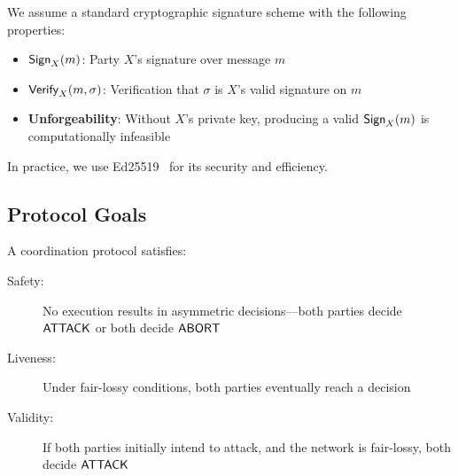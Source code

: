 We assume a standard cryptographic signature scheme with the following properties:
\begin{itemize}
    \item $\mathsf{Sign}_{X}(m)$: Party $X$'s signature over message $m$
    \item $\mathsf{Verify}_{X}(m, \sigma)$: Verification that $\sigma$ is $X$'s valid signature on $m$
    \item \textbf{Unforgeability}: Without $X$'s private key, producing a valid $\mathsf{Sign}_{X}(m)$ is computationally infeasible
\end{itemize}

In practice, we use Ed25519~\cite{ed25519} for its security and efficiency.

\subsection{Protocol Goals}

A coordination protocol satisfies:
\begin{description}
    \item[Safety:] No execution results in asymmetric decisions---both parties decide $\mathsf{ATTACK}$ or both decide $\mathsf{ABORT}$
    \item[Liveness:] Under fair-lossy conditions, both parties eventually reach a decision
    \item[Validity:] If both parties initially intend to attack, and the network is fair-lossy, both decide $\mathsf{ATTACK}$
\end{description}
